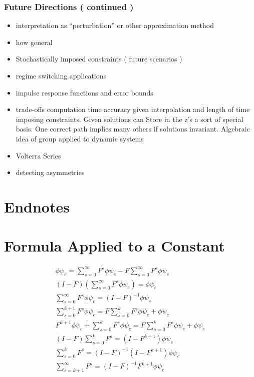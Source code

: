 \documentclass{beamer}
\begin{document}
   \begin{frame}
     \frametitle{Future Directions ( continued )}
     \begin{itemize}
\item interpretation as ``perturbation'' or other approximation method
\item how general
\item Stochastically imposed constraints ( future scenarios )
\item regime switching applications
\item impulse response functions and error bounds
\item trade-offs computation time accuracy given interpolation and length of time imposing constraints.  Given solutions can Store in the z's a sort of special basis. One correct path implies many others if solutions invariant.   Algebraic idea of group applied to dynamic systems
\item Volterra Series
\item detecting asymmetries
     \end{itemize}
   \end{frame}
   \begin{frame}
 
 
     
   \end{frame}


     \section{Endnotes}
\label{sec:endnotes}
{\tiny
     \theendnotes
}




\newpage
\section{Formula Applied to a Constant}
{\tiny
\begin{gather*}
\phi \psi_c=  \sum_{s=0}^\infty F^s \phi \psi_c  -   F \sum_{s=0}^\infty F^s \phi \psi_c \\
(I-F) \left (\sum_{s=0}^\infty F^s \phi \psi_c \right ) =\phi \psi_c\\
\sum_{s=0}^\infty F^s \phi \psi_c=(I - F)^{-1}\phi \psi_c\\
\sum_{s=0}^{k+1} F^s \phi \psi_c=F \sum_{s=0}^{k} F^s \phi \psi_c + \phi \psi_c\\
F^{k+1} \phi \psi_c +\sum_{s=0}^{k} F^s \phi \psi_c=F \sum_{s=0}^{k} F^s \phi \psi_c + \phi \psi_c\\
(I -F)\sum_{s=0}^{k} F^s  = (I- F^{k+1}) \phi \psi_c\\
\sum_{s=0}^{k} F^s  = (I -F)^{-1}(I- F^{k+1}) \phi \psi_c\\
\sum_{s=k+1}^{\infty} F^s  = (I -F)^{-1} F^{k+1}\phi \psi_c
\end{gather*}
}
\end{document}
